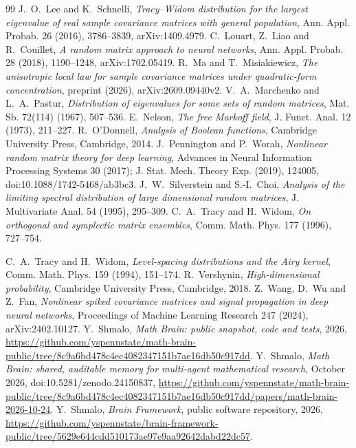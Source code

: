 \documentclass[11pt]{amsart}
\theoremstyle{remark}
\numberwithin{equation}{section}
\begin{document}
\begin{thebibliography}{99}
 J.~O.~Lee and K.~Schnelli, \emph{Tracy--Widom distribution for the largest eigenvalue of real sample covariance matrices with general population}, Ann. Appl. Probab. 26 (2016), 3786--3839, arXiv:1409.4979.
 C.~Louart, Z.~Liao and R.~Couillet, \emph{A random matrix approach to neural networks}, Ann. Appl. Probab. 28 (2018), 1190--1248, arXiv:1702.05419.
 R.~Ma and T.~Misiakiewicz, \emph{The anisotropic local law for sample covariance matrices under quadratic-form concentration}, preprint (2026), arXiv:2609.09440v2.
 V.~A.~Marchenko and L.~A.~Pastur, \emph{Distribution of eigenvalues for some sets of random matrices}, Mat. Sb. 72(114) (1967), 507--536.
 E.~Nelson, \emph{The free Markoff field}, J. Funct. Anal. 12 (1973), 211--227.
 R.~O'Donnell, \emph{Analysis of Boolean functions}, Cambridge University Press, Cambridge, 2014.
 J.~Pennington and P.~Worah, \emph{Nonlinear random matrix theory for deep learning}, Advances in Neural Information Processing Systems 30 (2017); J. Stat. Mech. Theory Exp. (2019), 124005, doi:10.1088/1742-5468/ab3bc3.
 J.~W.~Silverstein and S.-I.~Choi, \emph{Analysis of the limiting spectral distribution of large dimensional random matrices}, J. Multivariate Anal. 54 (1995), 295--309.
 C.~A.~Tracy and H.~Widom, \emph{On orthogonal and symplectic matrix ensembles}, Comm. Math. Phys. 177 (1996), 727--754.

 C.~A.~Tracy and H.~Widom, \emph{Level-spacing distributions and the Airy kernel}, Comm. Math. Phys. 159 (1994), 151--174.
 R.~Vershynin, \emph{High-dimensional probability}, Cambridge University Press, Cambridge, 2018.
 Z.~Wang, D.~Wu and Z.~Fan, \emph{Nonlinear spiked covariance matrices and signal propagation in deep neural networks}, Proceedings of Machine Learning Research 247 (2024), arXiv:2402.10127.
 Y.~Shmalo, \emph{Math Brain: public snapshot, code and tests}, 2026, \url{https://github.com/yspennstate/math-brain-public/tree/8c9a6bd478c4ec4082347151b7ae16db50c917dd}.
 Y.~Shmalo, \emph{Math Brain: shared, auditable memory for multi-agent mathematical research}, October 2026, doi:10.5281/zenodo.24150837, \url{https://github.com/yspennstate/math-brain-public/tree/8c9a6bd478c4ec4082347151b7ae16db50c917dd/papers/math-brain-2026-10-24}.
 Y.~Shmalo, \emph{Brain Framework}, public software repository, 2026, \url{https://github.com/yspennstate/brain-framework-public/tree/5629e644cdd510173ae97e9aa92642dabd22dc57}.
\end{thebibliography}
\end{document}
